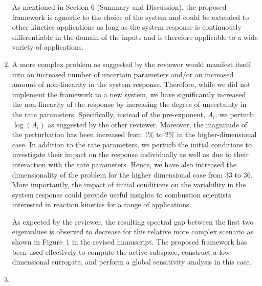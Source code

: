 \documentclass[11pt,final]{article}
\newcommand{\referee}[1]{\vspace{.1ex}\noindent{\textcolor{blue}{#1}}}
\begin{document}
\begin{enumerate}[wide, labelwidth=!, labelindent=0pt]
As mentioned in Section 6
(Summary and Discussion), the proposed framework is agnostic to the choice of the system and could be extended
to other kinetics applications as long as the system response is continuously differentiable in the domain of
the inputs and is therefore applicable to a wide variety of applications.    

\item \referee{Related to 1) above, it is of paramount importance that the authors consider, at least, 
methane, for which I expect less of a spectral gap in the matrix C. Ideally, more complex fuels with 
more nuanced responses.
In other words, if the method works well for a simple case, what is its value to the community?
The authors must try this out on a much more complex hydrocarbon/oxygen system.}

A more complex problem as suggested by the reviewer would manifest itself into an increased number of
uncertain parameters and/or an increased amount of non-linearity in the system response. Therefore, while
we did not implement the framework to a new system, we have significantly increased the non-linearity of the
response by increasing the degree of uncertainty in the rate parameters. Specifically, instead of
the pre-exponent, $A_i$, we perturb $\log(A_i)$ as suggested by the other reviewer. Moreover, 
the magnitude of the perturbation has been increased from 1$\%$ to $2\%$ in the
higher-dimensional case.
In addition to the rate parameters,
we perturb the initial conditions to investigate their impact on the response individually as well as due to
their interaction with the rate parameters. Hence, we have also increased the dimensionality of the problem
for the higher dimensional case from 33 to 36. More importantly, the impact of initial conditions on the
variability in the system response could provide useful insights to combustion scientists interested in 
reaction kinetics for a range of applications.

As expected by the reviewer, the resulting spectral gap between the first two eigenvalues is observed to
decrease for this relative more complex scenario as shown in Figure~1 in the revised manuscript. 
The proposed framework has been used effectively to compute the active subspace, construct a low-dimensional
surrogate, and perform a global sensitivity analysis in this case. 

\item \referee{The authors report ignition delay times of 0.1 s (?). See for example Fig. 7 and Tab. 2.
Are these seconds (s)? If this is the case, what kind of conditions (temperature/pressure/stoichiometry)
are the authors considering? They seem very unphysical if the yield an ignition delay time of O(0.1 s).
I could not find any clarification of the initial conditions for the ignition calculations.
This is again a symptom of the disconnect between the authors' aims (a novel method, potentially very useful to the combustion community) and the combustion community's aims (more understanding and tools that can be of help in combustion kinetics).}


\end{enumerate}
\end{document}
